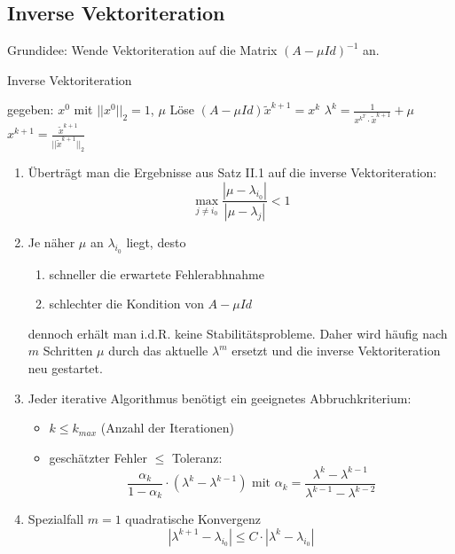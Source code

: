 \subsection{Inverse Vektoriteration}
Grundidee: Wende Vektoriteration auf die Matrix $(A-\mu Id)^{-1}$ an.
\begin{algorithm}
	\caption{Inverse Vektoriteration}
	\begin{algorithmic}
		\STATE gegeben: $x^{0}$ mit $||x^{0}||_{2}=1$, $\mu$
			\STATE Löse $(A-\mu Id)\tilde x^{k+1} = x^{k}$
			\STATE $\lambda^{k} = \frac{1}{x^{k^{T}}\cdot \tilde x^{k+1}} + \mu$
			\STATE $x^{k+1} = \frac{\tilde x^{k+1}}{||\tilde x^{k+1}||_{2}}$
		\ENDFOR
	\end{algorithmic}
\end{algorithm}

\begin{remark}
	\begin{enumerate}
		\item Überträgt man die Ergebnisse aus Satz II.1 auf die inverse Vektoriteration:
			$$\max_{j\not = i_{0}} \frac{|\mu - \lambda_{i_{0}}|}{|\mu - \lambda_{j}|} < 1$$
		\item Je näher $\mu$ an $\lambda_{i_{0}}$ liegt, desto
		\begin{enumerate}
			\item schneller die erwartete Fehlerabhnahme
			\item schlechter die Kondition von $A-\mu Id$
		\end{enumerate}
			dennoch erhält man i.d.R. keine Stabilitätsprobleme. Daher wird häufig nach $m$ Schritten $\mu$ durch das aktuelle
			$\lambda^{m}$ ersetzt und die inverse Vektoriteration neu gestartet.
		\item Jeder iterative Algorithmus benötigt ein geeignetes Abbruchkriterium:
		\begin{itemize}
			\item $k\leq k_{max}$ (Anzahl der Iterationen)
			\item geschätzter Fehler $\leq$ Toleranz:
			$$\frac{\alpha_{k}}{1-\alpha_{k}}\cdot (\lambda^{k}-\lambda^{k-1})\text{ mit } \alpha_{k}=\frac{\lambda^{k}-\lambda^{k-1}}{\lambda^{k-1}-\lambda^{k-2}}$$
		\end{itemize}
		\item Spezialfall $m=1$ quadratische Konvergenz
		$$|\lambda^{k+1}-\lambda_{i_{0}}|\leq C \cdot |\lambda^{k}-\lambda_{i_{0}}|$$
	\end{enumerate}
\end{remark}

